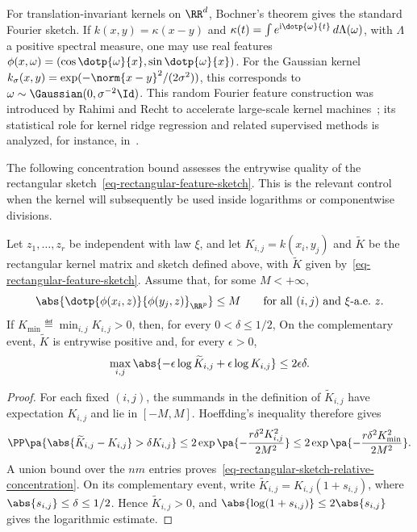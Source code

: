 For translation-invariant kernels on \(\RR^d\), Bochner's theorem gives the standard Fourier sketch. If \(k(x,y)=\kappa(x-y)\) and \(\kappa(t)=\int e^{\mathrm{i}\dotp{\omega}{t}}\,d\Lambda(\omega)\), with \(\Lambda\) a positive spectral measure, one may use real features \(\phi(x,\omega)=(\cos\dotp{\omega}{x},\sin\dotp{\omega}{x})\). For the Gaussian kernel \(k_\sigma(x,y)=\exp(-\norm{x-y}^2/(2\sigma^2))\), this corresponds to \(\omega\sim\Gaussian(0,\sigma^{-2}\Id)\). This random Fourier feature construction was introduced by Rahimi and Recht to accelerate large-scale kernel machines~\cite{RahimiRecht2007RandomFeatures}; its statistical role for kernel ridge regression and related supervised methods is analyzed, for instance, in~\cite{RudiRosasco2017RandomFeatures,AvronKapralovMusco2017RandomFourierKRR}.

The following concentration bound assesses the entrywise quality of the rectangular sketch~\eqref{eq-rectangular-feature-sketch}. This is the relevant control when the kernel will subsequently be used inside logarithms or componentwise divisions.

\begin{prop}
\label{prop-sinkhorn-sketch-positive-guarantee}
Let \(z_1,\ldots,z_r\) be independent with law \(\xi\), and let \(K_{i,j}=k(x_i,y_j)\) and \(\widetilde K\) be the rectangular kernel matrix and sketch defined above, with \(\widetilde K\) given by~\eqref{eq-rectangular-feature-sketch}. Assume that, for some \(M<+\infty\),
\[
	\abs{\dotp{\phi(x_i,z)}{\phi(y_j,z)}_{\RR^p}}\leq M
	\qquad \text{for all }(i,j)\text{ and }\xi\text{-a.e.\ }z.
\]
If \(K_{\min}\eqdef\min_{i,j}K_{i,j}>0\), then, for every \(0<\delta\leq1/2\),
On the complementary event, \(\widetilde K\) is entrywise positive and, for every \(\epsilon>0\),
\[
	\max_{i,j}
	\abs{-\epsilon\log\widetilde K_{i,j}+\epsilon\log K_{i,j}}
	\leq 2\epsilon\delta.
\]
\end{prop}

\begin{proof}
For each fixed \((i,j)\), the summands in the definition of \(\widetilde K_{i,j}\) have expectation \(K_{i,j}\) and lie in \([-M,M]\). Hoeffding's inequality therefore gives
\[
	\PP\pa{
		\abs{\widetilde K_{i,j}-K_{i,j}}>\delta K_{i,j}
	}
	\leq
	2\exp\pa{-\frac{r\delta^2K_{i,j}^2}{2M^2}}
	\leq
	2\exp\pa{-\frac{r\delta^2K_{\min}^2}{2M^2}}.
\]
A union bound over the \(nm\) entries proves~\eqref{eq-rectangular-sketch-relative-concentration}. On its complementary event, write \(\widetilde K_{i,j}=K_{i,j}(1+s_{i,j})\), where \(\abs{s_{i,j}}\leq\delta\leq1/2\). Hence \(\widetilde K_{i,j}>0\), and \(\abs{\log(1+s_{i,j})}\leq2\abs{s_{i,j}}\) gives the logarithmic estimate.
\end{proof}

